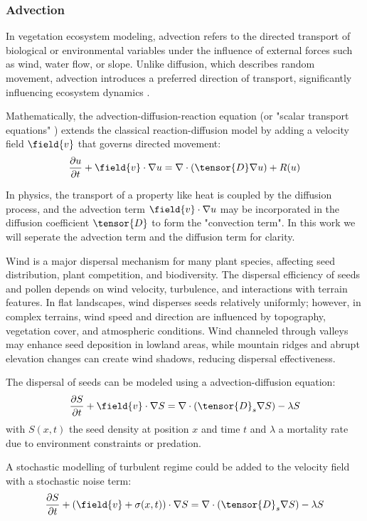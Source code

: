 \subsubsection{Advection}
In vegetation ecosystem modeling, advection refers to the directed transport of biological or environmental variables under the influence of external forces such as wind, water flow, or slope. Unlike diffusion, which describes random movement, advection introduces a preferred direction of transport, significantly influencing ecosystem dynamics \cite{Burger2020}. 

Mathematically, the advection-diffusion-reaction equation (or "scalar transport equations" \cite{Baukal2000}) extends the classical reaction-diffusion model by adding a velocity field $\field{v}$ that governs directed movement:
\begin{align}
    \frac{\partial u}{\partial t} + \field{v} \cdot \nabla u = \nabla \cdot \left( \tensor{D} \nabla u \right) + R(u)
\end{align}

In physics, the transport of a property like heat is coupled by the diffusion process, and the advection term $\field{v} \cdot \nabla u$ may be incorporated in the diffusion coefficient $\tensor{D}$ to form the "convection term". In this work we will seperate the advection term and the diffusion term for clarity.

Wind is a major dispersal mechanism for many plant species, affecting seed distribution, plant competition, and biodiversity. The dispersal efficiency of seeds and pollen depends on wind velocity, turbulence, and interactions with terrain features. In flat landscapes, wind disperses seeds relatively uniformly; however, in complex terrains, wind speed and direction are influenced by topography, vegetation cover, and atmospheric conditions. Wind channeled through valleys may enhance seed deposition in lowland areas, while mountain ridges and abrupt elevation changes can create wind shadows, reducing dispersal effectiveness.

The dispersal of seeds can be modeled using a advection-diffusion equation:
\begin{align}
    \frac{\partial S}{\partial t} + \field{v} \cdot \nabla S = \nabla \cdot (\tensor{D}_s \nabla S) - \lambda S
\end{align}
with $S(x, t)$ the seed density at position $x$ and time $t$ and $\lambda$ a mortality rate due to environment constraints or predation.

A stochastic modelling of turbulent regime could be added to the velocity field with a stochastic noise term:
\begin{align}
    \frac{\partial S}{\partial t} + (\field{v} + \sigma(x, t)) \cdot \nabla S = \nabla \cdot (\tensor{D}_s \nabla S) - \lambda S
\end{align}


